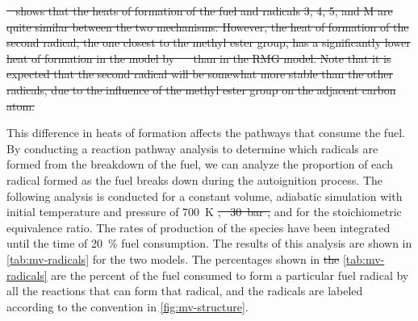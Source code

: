 \documentclass[letterpaper, review, sort&compress]{elsarticle}
\providecommand{\DIFadd}[1]{{\protect\color{blue}\uwave{#1}}} %
\providecommand{\DIFdel}[1]{{\protect\color{red}\sout{#1}}}                      %
\providecommand{\DIFaddbegin}{} %
\providecommand{\DIFaddend}{} %
\providecommand{\DIFdelbegin}{} %
\providecommand{\DIFdelend}{} %
\newcommand{\DIFscaledelfig}{0.5}
\newlength{\DIFdelgraphicswidth} %
\newlength{\DIFdelgraphicsheight} %
\newcommand{\DIFaddincludegraphics}[2][]{{\color{blue}\fbox{\DIFOincludegraphics[#1]{#2}}}} %
\newcommand{\DIFdelincludegraphics}[2][]{%
\sbox{\DIFdelgraphicsbox}{\DIFOincludegraphics[#1]{#2}}%
\settoboxwidth{\DIFdelgraphicswidth}{\DIFdelgraphicsbox} %
\settoboxtotalheight{\DIFdelgraphicsheight}{\DIFdelgraphicsbox} %
\scalebox{\DIFscaledelfig}{%
\parbox[b]{\DIFdelgraphicswidth}{\usebox{\DIFdelgraphicsbox}\\[-\baselineskip] \rule{\DIFdelgraphicswidth}{0em}}\llap{\resizebox{\DIFdelgraphicswidth}{\DIFdelgraphicsheight}{%
\setlength{\unitlength}{\DIFdelgraphicswidth}%
\begin{picture}(1,1)%
\thicklines\linethickness{2pt} %
{\color[rgb]{1,0,0}\put(0,0){\framebox(1,1){}}}%
{\color[rgb]{1,0,0}\put(0,0){\line( 1,1){1}}}%
{\color[rgb]{1,0,0}\put(0,1){\line(1,-1){1}}}%
\end{picture}%
}\hspace*{3pt}}} %
} %
\DeclareRobustCommand{\DIFaddbegin}{\DIFOaddbegin \let\includegraphics\DIFaddincludegraphics} %
\DeclareRobustCommand{\DIFaddend}{\DIFOaddend \let\includegraphics\DIFOincludegraphics} %
\DeclareRobustCommand{\DIFdelbegin}{\DIFOdelbegin \let\includegraphics\DIFdelincludegraphics} %
\DeclareRobustCommand{\DIFdelend}{\DIFOaddend \let\includegraphics\DIFOincludegraphics} %
\begin{document}
\DIFdelbegin \DIFdel{\mbox{%
 }\hspace{0pt}%
shows that the heats of formation of the fuel and radicals 3, 4, 5, and
M are quite similar between the two mechanisms. However, the heat of formation of the second
radical, the one closest to the methyl ester group, has a significantly lower heat of formation in
the model by \mbox{%
\citet{Dievart2013} }\hspace{0pt}%
than in the RMG model. Note that it is expected that the second
radical will be somewhat more stable than the other radicals, due to the influence of the methyl
ester group on the adjacent carbon atom.
}%

\DIFdelend This difference in heats of formation affects the pathways that consume the fuel. By conducting a
reaction pathway analysis to determine which radicals are formed from the breakdown of the fuel, we
can analyze the proportion of each radical formed as the fuel breaks down during the autoignition
process. The following analysis is conducted for a constant volume, adiabatic simulation with
initial temperature and pressure of \SI{700}{\K} \DIFdelbegin \DIFdel{, \mbox{%
\SI{30}{\bar}}\hspace{0pt}%
, }\DIFdelend \DIFaddbegin \DIFadd{and \mbox{%
\SI{30}{\bar}}\hspace{0pt}%
, respectively, }\DIFaddend and for the
stoichiometric equivalence ratio. The rates of production of the species have been integrated until
the time of \SI{20}{\percent} fuel consumption. The results of this analysis are shown in
\cref{tab:mv-radicals} for the two models. The percentages shown in \DIFdelbegin \DIFdel{the }\DIFdelend \cref{tab:mv-radicals} are the
percent of the fuel consumed to form a particular fuel radical by all the reactions that can form
that radical, and the radicals are labeled according to the convention in \cref{fig:mv-structure}.
\end{document}
